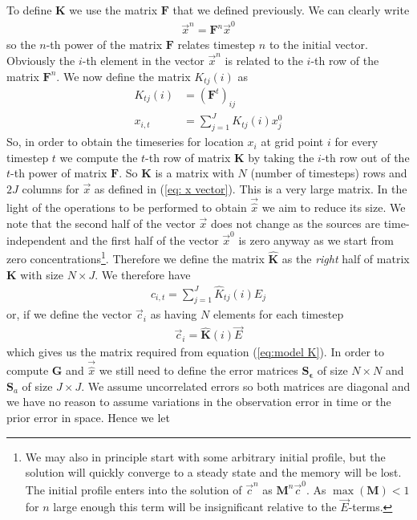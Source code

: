\documentclass[]{article}
\begin{document}
To define $\mathbf{K}$ we use the matrix $\mathbf{F}$ that we defined previously. We can clearly write
\begin{align}
\vec{x}^{n} = \mathbf{F}^n \vec{x}^0
\end{align}
so the $n$-th power of the matrix $\mathbf{F}$ relates timestep $n$ to the initial vector. Obviously the $i$-th element in the vector $\vec{x}^n$ is related to the $i$-th row of the matrix $\mathbf{F}^n$. We now define the matrix $K_{tj}(i)$ as
\begin{align}
K_{tj}(i) &= \left(\mathbf{F}^{t}\right)_{ij} \\
x_{i,t} &= \sum_{j = 1}^{J} K_{tj}(i) x_j^0
\end{align}
So, in order to obtain the timeseries for location $x_i$ at grid point $i$ for every timestep $t$ we compute the $t$-th row of matrix $\mathbf{K}$ by taking the $i$-th row out of the $t$-th power of matrix $\mathbf{F}$. So $\mathbf{K}$ is a matrix with $N$ (number of timesteps) rows and $2 J$ columns for $\vec{x}$ as defined in (\ref{eq: x vector}). This is a very large matrix. In the light of the operations to be performed to obtain $\vec{\hat{x}}$ we aim to reduce its size. We note that the second half of the vector $\vec{x}$ does not change as the sources are time-independent and the first half of the vector $\vec{x}^0$ is zero anyway as we start from zero concentrations\footnote{We may also in principle start with some arbitrary initial profile, but the solution will quickly converge to a steady state and the memory will be lost. The initial profile enters into the solution of $\vec{c}^n$ as $\mathbf{M}^n \vec{c}^0$. As $\max(\mathbf{M})<1$ for $n$ large enough this term will be insignificant relative to the $\vec{E}$-terms.}. Therefore we define the matrix $\hat{\mathbf{K}}$ as the \textit{right} half of matrix $\mathbf{K}$ with size $N \times J$. We therefore have
\begin{align}
c_{i,t} = \sum_{j = 1}^{J} \hat{K}_{tj}(i) E_j
\end{align}
or, if we define the vector $\vec{c}_i$ as having $N$ elements for each timestep
\begin{align}
\vec{c}_i = \mathbf{\hat{K}}(i) \vec{E}
\end{align}
which gives us the matrix required from equation (\ref{eq:model K}).
\newline \newline
In order to compute $\mathbf{G}$ and $\vec{\hat{x}}$ we still need to define the error matrices $\mathbf{S_\epsilon}$ of size $N \times N$ and $\mathbf{S}_a$ of size $J \times J$. We assume uncorrelated errors so both matrices are diagonal and we have no reason to assume variations in the observation error in time or the prior error in space. Hence we let
\end{document}
